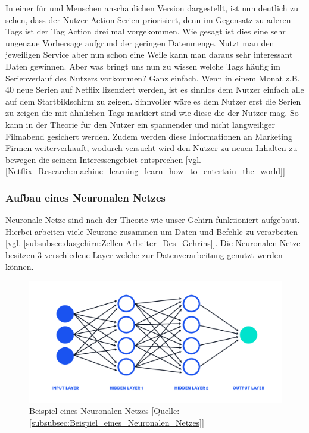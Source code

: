             In einer für und Menschen anschaulichen Version dargestellt, ist nun deutlich zu sehen, dass der Nutzer Action-Serien priorisiert, denn im Gegensatz zu aderen Tags ist der Tag Action drei mal vorgekommen. Wie gesagt ist dies eine sehr ungenaue Vorhersage aufgrund der geringen Datenmenge. Nutzt man den jeweiligen Service aber nun schon eine Weile kann man daraus sehr interessant Daten gewinnen. Aber was bringt uns nun zu wissen welche Tags häufig im Serienverlauf des Nutzers vorkommen? Ganz einfach. Wenn in einem Monat z.B. 40 neue Serien auf Netflix lizenziert werden, ist es sinnlos dem Nutzer einfach alle auf dem Startbildschirm zu zeigen. Sinnvoller wäre es dem Nutzer erst die Serien zu zeigen die mit ähnlichen Tags markiert sind wie diese die der Nutzer mag. So kann in der Theorie für den Nutzer ein spannender und nicht langweiliger Filmabend gesichert werden. Zudem werden diese Informationen an Marketing Firmen weiterverkauft, wodurch versucht wird den Nutzer zu neuen Inhalten zu bewegen die seinem Interessengebiet entsprechen [vgl. \ref{Netflix_Research:machine_learning_learn_how_to_entertain_the_world}]

        \subsubsection{Aufbau eines Neuronalen Netzes}

            Neuronale Netze sind nach der Theorie wie unser Gehirn funktioniert aufgebaut. Hierbei arbeiten viele Neurone zusammen um Daten und Befehle zu verarbeiten [vgl. \ref{subsubsec:dasgehirn:Zellen-Arbeiter_Des_Gehrins}]. Die Neuronalen Netze besitzen 3 verschiedene Layer welche zur Datenverarbeitung genutzt werden können.\\

            \begin{figure}[ht]
                \includegraphics[width=\textwidth, scale=0.8]{resources/images/img/Neural Networks/neural-network-example.png}
                \caption{Beispiel eines Neuronalen Netzes [Quelle: \ref{subsubsec:Beispiel_eines_Neuronalen_Netzes}]}
                \label{fig:Beispiel_Neuronales_Netz}
            \end{figure}
            
